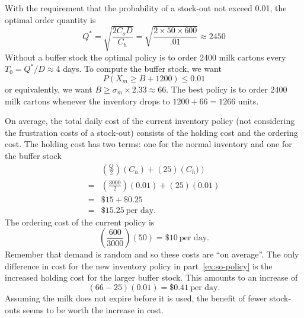 \begin{enumerate}
\begin{solution}
With the requirement that the probability of a stock-out not exceed
0.01, the optimal order quantity is
\[
  Q^{\ast} = \sqrt{\frac{2C_oD}{C_h}} = 
  \sqrt{\frac{2\times 50\times 600}{.01}} \approx 2450
\]
Without a buffer stock the optimal policy is to order 
\num{2400} milk cartons every $T_0=Q^{\ast}/D \approx 4$ days. 
To compute the buffer stock, we want
\[
  P(X_m \geq B + 1200) \leq 0.01
\]
or equivalently, we want $B \geq \sigma_m \times 
2.33 \approx 66$.
The best policy is to order \num{2400} milk cartons 
whenever the inventory drops to $\num{1200}+66=\num{1266}$ units.

On average, the total daily cost of the current inventory policy (not
considering the frustration costs of a stock-out) consists of the
holding cost and the ordering cost. The holding cost has two terms:
one for the normal inventory and one for the buffer stock
\begin{align*}
 & \left(\frac{Q}{2}\right)\left(C_h\right)  + \left(25\right)\left(C_h)\right)\\
= & \left(\frac{3000}{2}\right)\left(0.01\right) + (25)(0.01) \\
= & \$15 + \$0.25 \\
= & \$15.25 ~\text{per day.}
\end{align*}
The ordering cost of the current policy is
\[ \left(\frac{600}{3000}\right) \left(50\right) = \$10~\text{per
    day.} \] Remember that demand is random and so these costs are
``on average''.  The only difference in cost for the new inventory
policy in part~\ref{ex:so-policy} is the increased holding cost for
the larger buffer stock. This amounts to an increase of
\[ (66 - 25) (0.01) = \$0.41~\text{per day.} \]
Assuming the milk does not expire before it is used, the benefit
of fewer stock-outs seems to be worth the increase in cost.
\end{solution}

\end{enumerate}
